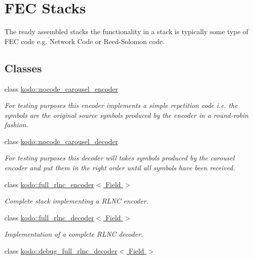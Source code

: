 \hypertarget{group__fec__stacks}{\section{F\-E\-C Stacks}
\label{group__fec__stacks}
}


The ready assembled stacks the functionality in a stack is typically some type of F\-E\-C code e.\-g. Network Code or Reed-\/\-Solomon code.  


\subsection*{Classes}
\begin{DoxyCompactItemize}
\item 
class \hyperlink{classkodo_1_1nocode__carousel__encoder}{kodo\-::nocode\-\_\-carousel\-\_\-encoder}
\begin{DoxyCompactList}\small\item\em For testing purposes this encoder implements a simple repetition code i.\-e. the symbols are the original source symbols produced by the encoder in a round-\/robin fashion. \end{DoxyCompactList}\item 
class \hyperlink{classkodo_1_1nocode__carousel__decoder}{kodo\-::nocode\-\_\-carousel\-\_\-decoder}
\begin{DoxyCompactList}\small\item\em For testing purposes this decoder will takes symbols produced by the carousel encoder and put them in the right order until all symbols have been received. \end{DoxyCompactList}\item 
class \hyperlink{classkodo_1_1full__rlnc__encoder}{kodo\-::full\-\_\-rlnc\-\_\-encoder$<$ Field $>$}
\begin{DoxyCompactList}\small\item\em Complete stack implementing a R\-L\-N\-C encoder. \end{DoxyCompactList}\item 
class \hyperlink{classkodo_1_1full__rlnc__decoder}{kodo\-::full\-\_\-rlnc\-\_\-decoder$<$ Field $>$}
\begin{DoxyCompactList}\small\item\em Implementation of a complete R\-L\-N\-C decoder. \end{DoxyCompactList}\item 
class \hyperlink{classkodo_1_1debug__full__rlnc__decoder}{kodo\-::debug\-\_\-full\-\_\-rlnc\-\_\-decoder$<$ Field $>$}

\end{DoxyCompactItemize}
